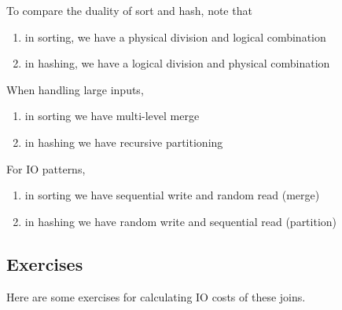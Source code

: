     To compare the duality of sort and hash, note that 
    \begin{enumerate}
      \item in sorting, we have a physical division and logical combination 
      \item in hashing, we have a logical division and physical combination
    \end{enumerate}
    When handling large inputs, 
    \begin{enumerate}
      \item in sorting we have multi-level merge 
      \item in hashing we have recursive partitioning 
    \end{enumerate}
    For IO patterns, 
    \begin{enumerate}
      \item in sorting we have sequential write and random read (merge) 
      \item in hashing we have random write and sequential read (partition) 
    \end{enumerate}

\subsection{Exercises} 

  Here are some exercises for calculating IO costs of these joins. 


